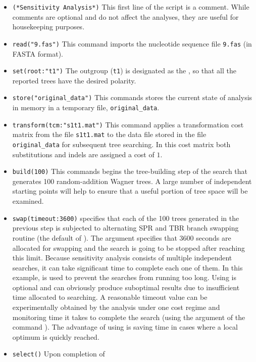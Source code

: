\begin{itemize} 
\item \texttt{(*Sensitivity Analysis*)} This first line of the script 
is a comment. While comments are optional and do not affect the analyses, 
they are useful for housekeeping purposes.
\item \texttt{read("9.fas")} This command imports the nucleotide
sequence file \texttt{9.fas} (in FASTA format).  
\item \texttt{set(root:"t1")} The outgroup (\texttt{t1}) is designated
as the , so that all the reported trees have the
desired polarity.  
\item \texttt{store("original\_data")} This commands stores the current 
state of analysis in memory in a temporary file, \texttt{original\_data}.  
\item \texttt{transform(tcm:"s1t1.mat")}
This command applies a transformation cost matrix from the file
\texttt{s1t1.mat} to the data file stored in the file
\texttt{original\_data} for subsequent tree searching. In this cost
matrix both substitutions and indels are assigned a cost of $ 1 $.
\item \texttt{build(100)} This commands begins the tree-building
step of the search that generates 100 random-addition Wagner trees.
A large number of independent starting points will help to ensure 
that a useful portion of tree space will be examined.  
\item \texttt{swap(timeout:3600)}  specifies that 
each of the 100 trees generated
in the previous step is subjected to alternating SPR and TBR branch
swapping routine (the default of \poy). The argument 
specifies that 3600 seconds are allocated for swapping and the
search is going to be stopped after reaching this limit. Because
sensitivity analysis consists of multiple independent searches, it
can take significant time to complete each one of them.
In this example,  is used to prevent the
searches from running too long. Using  is
optional and can obviously produce suboptimal results due to
insufficient time allocated to searching. A reasonable timeout value
can be experimentally obtained by the analysis under one cost regime
and monitoring time it takes to complete the search (using the
argument  of the command ). The
advantage of using  is saving time in cases
where a local optimum is quickly reached.  
\item \texttt{select()} Upon completion of

\end{itemize}
